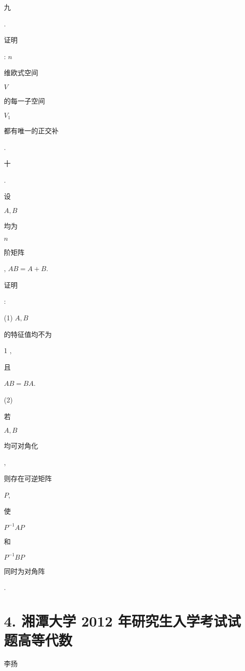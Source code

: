 \documentclass[10pt]{article}
\begin{document}
\begin{CJK}{UTF8}{mj}九\end{CJK}. \begin{CJK}{UTF8}{mj}证明\end{CJK}: $n$ \begin{CJK}{UTF8}{mj}维欧式空间\end{CJK} $V$ \begin{CJK}{UTF8}{mj}的每一子空间\end{CJK} $V_{1}$ \begin{CJK}{UTF8}{mj}都有唯一的正交补\end{CJK}.

\begin{CJK}{UTF8}{mj}十\end{CJK}. \begin{CJK}{UTF8}{mj}设\end{CJK} $A, B$ \begin{CJK}{UTF8}{mj}均为\end{CJK} $n$ \begin{CJK}{UTF8}{mj}阶矩阵\end{CJK}, $A B=A+B$. \begin{CJK}{UTF8}{mj}证明\end{CJK}:

(1) $A, B$ \begin{CJK}{UTF8}{mj}的特征值均不为\end{CJK} 1 , \begin{CJK}{UTF8}{mj}且\end{CJK} $A B=B A$.

(2) \begin{CJK}{UTF8}{mj}若\end{CJK} $A, B$ \begin{CJK}{UTF8}{mj}均可对角化\end{CJK}, \begin{CJK}{UTF8}{mj}则存在可逆矩阵\end{CJK} $P$, \begin{CJK}{UTF8}{mj}使\end{CJK} $P^{-1} A P$ \begin{CJK}{UTF8}{mj}和\end{CJK} $P^{-1} B P$ \begin{CJK}{UTF8}{mj}同时为对角阵\end{CJK}.

\section{4. 湘潭大学 2012 年研究生入学考试试题高等代数}
\begin{CJK}{UTF8}{mj}李扬\end{CJK}
\end{document}
